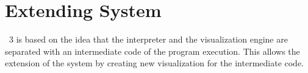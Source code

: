 \section{Extending \jel{} System}
\label{sec:Extending_Jeliot_System}

\jel{}~3 is based on the idea that the interpreter and the visualization engine are separated with an intermediate code of the program execution. This allows the extension of the system by creating new visualization for the intermediate code. 